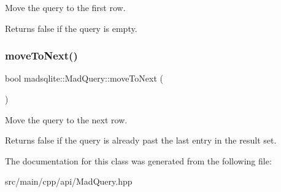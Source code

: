 Move the query to the first row. \begin{DoxyReturn}{Returns}
false if the query is empty. 
\end{DoxyReturn}
\hypertarget{classmadsqlite_1_1_mad_query_a2eecba50378a4577803aff41671829fe}{}\label{classmadsqlite_1_1_mad_query_a2eecba50378a4577803aff41671829fe} 
\subsubsection{\texorpdfstring{move\+To\+Next()}{moveToNext()}}
{\footnotesize\ttfamily bool madsqlite\+::\+Mad\+Query\+::move\+To\+Next (\begin{DoxyParamCaption}{ }\end{DoxyParamCaption})}

Move the query to the next row. \begin{DoxyReturn}{Returns}
false if the query is already past the last entry in the result set. 
\end{DoxyReturn}


The documentation for this class was generated from the following file\+:\begin{DoxyCompactItemize}
\item 
src/main/cpp/api/Mad\+Query.\+hpp\end{DoxyCompactItemize}
